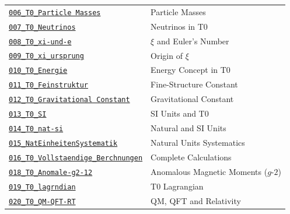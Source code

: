 {\begin{longtable}{@{}>{\raggedright\arraybackslash}p{} >{\raggedright\arraybackslash}p{}@{}}
\href{https://github.com/jpascher/T0-Time-Mass-Duality/blob/main/2/pdf/006_T0_Particle Masses_De.pdf}{\texttt{006\_T0\_Particle Masses}} & Particle Masses \\
\href{https://github.com/jpascher/T0-Time-Mass-Duality/blob/main/2/pdf/007_T0_Neutrinos_De.pdf}{\texttt{007\_T0\_Neutrinos}} & Neutrinos in T0 \\
\href{https://github.com/jpascher/T0-Time-Mass-Duality/blob/main/2/pdf/008_T0_xi-und-e_De.pdf}{\texttt{008\_T0\_xi-und-e}} & $\xi$ and Euler's Number \\
\href{https://github.com/jpascher/T0-Time-Mass-Duality/blob/main/2/pdf/009_T0_xi_ursprung_De.pdf}{\texttt{009\_T0\_xi\_ursprung}} & Origin of $\xi$ \\
\href{https://github.com/jpascher/T0-Time-Mass-Duality/blob/main/2/pdf/010_T0_Energie_De.pdf}{\texttt{010\_T0\_Energie}} & Energy Concept in T0 \\
\href{https://github.com/jpascher/T0-Time-Mass-Duality/blob/main/2/pdf/011_T0_Feinstruktur_De.pdf}{\texttt{011\_T0\_Feinstruktur}} & Fine-Structure Constant \\
\href{https://github.com/jpascher/T0-Time-Mass-Duality/blob/main/2/pdf/012_T0_Gravitational Constant_De.pdf}{\texttt{012\_T0\_Gravitational Constant}} & Gravitational Constant \\
\href{https://github.com/jpascher/T0-Time-Mass-Duality/blob/main/2/pdf/013_T0_SI_De.pdf}{\texttt{013\_T0\_SI}} & SI Units and T0 \\
\href{https://github.com/jpascher/T0-Time-Mass-Duality/blob/main/2/pdf/014_T0_nat-si_De.pdf}{\texttt{014\_T0\_nat-si}} & Natural and SI Units \\
\href{https://github.com/jpascher/T0-Time-Mass-Duality/blob/main/2/pdf/015_NatEinheitenSystematik_De.pdf}{\texttt{015\_NatEinheitenSystematik}} & Natural Units Systematics \\
\href{https://github.com/jpascher/T0-Time-Mass-Duality/blob/main/2/pdf/016_T0_Vollstaendige_Berchnungen_De.pdf}{\texttt{016\_T0\_Vollstaendige\_Berchnungen}} & Complete Calculations \\
\href{https://github.com/jpascher/T0-Time-Mass-Duality/blob/main/2/pdf/018_T0_Anomale-g2-12_En.pdf}{\texttt{018\_T0\_Anomale-g2-12}} & Anomalous Magnetic Moments ($g$-$2$) \\
\href{https://github.com/jpascher/T0-Time-Mass-Duality/blob/main/2/pdf/019_T0_lagrndian_De.pdf}{\texttt{019\_T0\_lagrndian}} & T0 Lagrangian \\
\href{https://github.com/jpascher/T0-Time-Mass-Duality/blob/main/2/pdf/020_T0_QM-QFT-RT_De.pdf}{\texttt{020\_T0\_QM-QFT-RT}} & QM, QFT and Relativity \\

\end{longtable}}
